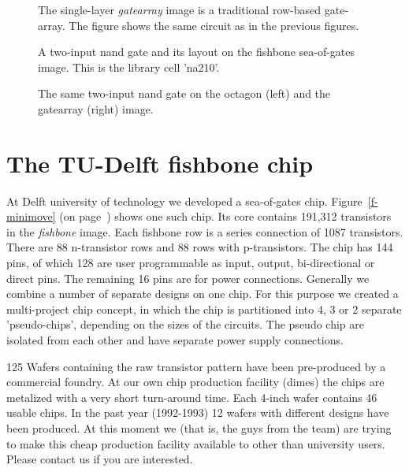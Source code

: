 \begin{figure}
\centerline{}
\caption{The single-layer {\em gatearray} image is a traditional row-based
gate-array. The figure shows the same circuit as in the previous figures.}
\label{gatehotel}
\end{figure}

\begin{figure}
\caption{A two-input {\sc nand} gate and its layout on the fishbone sea-of-gates
         image. This is the library cell 'na210'.} 
\label{f-nand2}
\end{figure}

\begin{figure}
\caption{
The same two-input nand gate on the octagon (left) and the gatearray (right)
image.}
\label{othernand2}
\end{figure}

\section{The TU-Delft fishbone chip}
At Delft university of technology we developed a sea-of-gates chip.
Figure~\ref{f-minimove} (on page~\pageref{f-minimove}) shows one such chip. Its
core contains 191,312 transistors in the {\sl fishbone} image. Each fishbone
row is a series connection of 1087 transistors. There are 88
n-transistor rows and 88 rows with p-transistors. The chip has 144 pins, of
which 128 are user programmable as input, output, bi-directional or direct
pins. The remaining 16 pins are for power connections.  Generally we combine a
number of separate designs on one chip. For this purpose we created a
multi-project chip concept, in which the chip is partitioned into 4, 3 or 2
separate 'pseudo-chips', depending on the sizes of the circuits. The pseudo
chip are isolated from each other and have separate power supply connections.

125 Wafers containing the raw transistor pattern have been pre-produced by a
commercial foundry. At our own chip production facility ({\sc dimes}) the chips
are metalized with a very short turn-around time. Each 4-inch wafer contains 46
usable chips.  In the past year (1992-1993) 12 wafers with different designs
have been produced. At this moment we (that is, the guys from the 
team) are trying to make this cheap production facility available to other than
university users. Please contact us if you are interested. 


